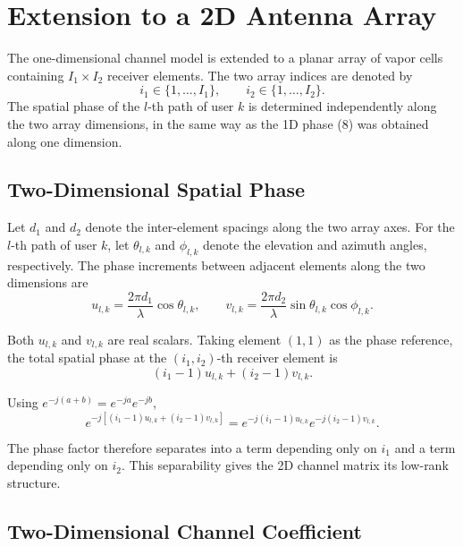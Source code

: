 \documentclass[12pt,a4paper]{article}
\begin{document}

\section{Extension to a 2D Antenna Array}

The one-dimensional channel model is extended to a planar array of
vapor cells containing $I_1\times I_2$ receiver elements. The two
array indices are denoted by
\[
i_1\in\{1,\ldots,I_1\},
\qquad
i_2\in\{1,\ldots,I_2\}.
\]
The spatial phase of the $l$-th path of user $k$ is determined
independently along the two array dimensions, in the same way as the
1D phase (8) was obtained along one dimension.

\subsection{Two-Dimensional Spatial Phase}

Let $d_1$ and $d_2$ denote the inter-element spacings along the two
array axes. For the $l$-th path of user $k$, let $\theta_{l,k}$ and
$\phi_{l,k}$ denote the elevation and azimuth angles, respectively.
The phase increments between adjacent elements along the two
dimensions are
\begin{equation}
\boxed{
 u_{l,k}=\frac{2\pi d_1}{\lambda}\cos\theta_{l,k},
 \qquad
 v_{l,k}=\frac{2\pi d_2}{\lambda}
 \sin\theta_{l,k}\cos\phi_{l,k}.
}
\tag{370}
\end{equation}

Both $u_{l,k}$ and $v_{l,k}$ are real scalars. Taking element $(1,1)$
as the phase reference, the total spatial phase at the $(i_1,i_2)$-th
receiver element is
\begin{equation}
\boxed{
 (i_1-1)u_{l,k}+(i_2-1)v_{l,k}.
}
\tag{371}
\end{equation}

Using $e^{-j(a+b)}=e^{-ja}e^{-jb}$,
\begin{equation}
 e^{-j[(i_1-1)u_{l,k}+(i_2-1)v_{l,k}]}
 =e^{-j(i_1-1)u_{l,k}}
  e^{-j(i_2-1)v_{l,k}}.
\tag{372}
\end{equation}

The phase factor therefore separates into a term depending only on
$i_1$ and a term depending only on $i_2$. This separability gives the
2D channel matrix its low-rank structure.

\subsection{Two-Dimensional Channel Coefficient}
\end{document}

